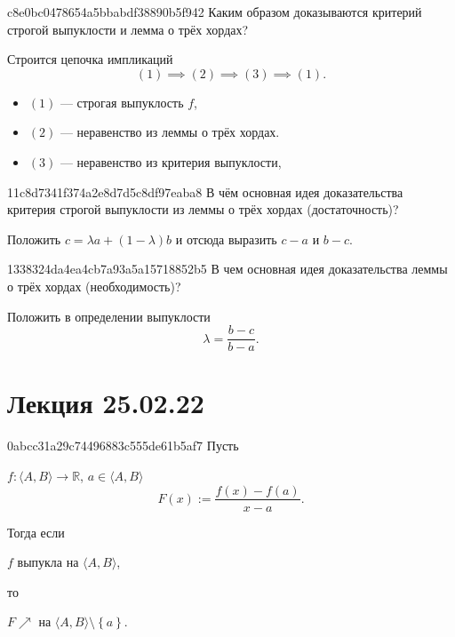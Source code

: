 \begin{note}{c8e0bc0478654a5bbabdf38890b5f942}
    Каким образом доказываются критерий строгой выпуклости и лемма о трёх хордах?

    \begin{cloze}{1}
        Строится цепочка импликаций
        \[
            (1) \implies (2) \implies (3) \implies (1).
        \]
        \begin{itemize}
            \item \({ (1) }\) --- строгая выпуклость \({ f }\),
            \item \({ (2) }\) --- неравенство из леммы о трёх хордах.
            \item \({ (3) }\) --- неравенство из критерия выпуклости,
        \end{itemize}
    \end{cloze}
\end{note}

\begin{note}{11c8d7341f374a2e8d7d5c8df97eaba8}
    В чём основная идея доказательства критерия строгой выпуклости из леммы о трёх хордах (достаточность)?

    \begin{cloze}{1}
        Положить \({ c = \lambda a + (1 - \lambda) b }\) и отсюда выразить \({ c - a }\) и \({ b - c }\).
    \end{cloze}
\end{note}

\begin{note}{1338324da4ea4cb7a93a5a15718852b5}
    В чем основная идея доказательства леммы о трёх хордах (необходимость)?

    \begin{cloze}{1}
        Положить в определении выпуклости
        \[
            \lambda = \frac{b - c}{b - a}.
        \]
    \end{cloze}
\end{note}

\section{Лекция 25.02.22}
\begin{note}{0abcc31a29c74496883c555de61b5af7}
    Пусть \begin{icloze}{3}\( f : \langle A, B \rangle \to \mathbb R \), \( a \in \langle A, B \rangle  \)
    \[
        F(x) := \frac{f(x) - f(a)}{x - a}.
    \]\end{icloze}

    Тогда если \begin{icloze}{2}\( f \) выпукла на \( \langle A, B \rangle  \),\end{icloze} то
    \begin{icloze}{1}
        \begin{center}
            \( F \!\!\nearrow \) на \( \langle A, B \rangle \setminus \left\{ a \right\} \).
        \end{center}
    \end{icloze}
\end{note}

